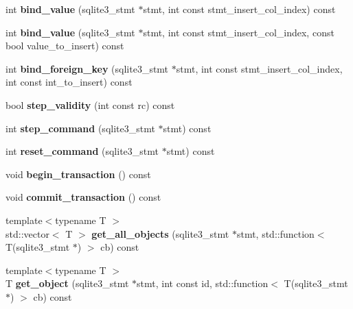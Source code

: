 \begin{DoxyCompactItemize}
int {\bfseries bind\+\_\+value} (sqlite3\+\_\+stmt $\ast$stmt, int const stmt\+\_\+insert\+\_\+col\+\_\+index) const
\item 
\mbox{\label{class_s_q_lite_wrapper_a4b6f58f924fae97702115f34ea8abf22}} 
int {\bfseries bind\+\_\+value} (sqlite3\+\_\+stmt $\ast$stmt, int const stmt\+\_\+insert\+\_\+col\+\_\+index, const bool value\+\_\+to\+\_\+insert) const
\item 
\mbox{\label{class_s_q_lite_wrapper_a21b4c5733febabb2a4f21772b7cfdec1}} 
int {\bfseries bind\+\_\+foreign\+\_\+key} (sqlite3\+\_\+stmt $\ast$stmt, int const stmt\+\_\+insert\+\_\+col\+\_\+index, int const int\+\_\+to\+\_\+insert) const
\item 
\mbox{\label{class_s_q_lite_wrapper_a2c0169834d2518ede1f00b92ffbed3e2}} 
bool {\bfseries step\+\_\+validity} (int const rc) const
\item 
\mbox{\label{class_s_q_lite_wrapper_aed2fd5a33db820461662e6ffdc05808b}} 
int {\bfseries step\+\_\+command} (sqlite3\+\_\+stmt $\ast$stmt) const
\item 
\mbox{\label{class_s_q_lite_wrapper_aeef995f134463b92babcd805444a1783}} 
int {\bfseries reset\+\_\+command} (sqlite3\+\_\+stmt $\ast$stmt) const
\item 
\mbox{\label{class_s_q_lite_wrapper_a7390f800549dbb01bb6bea58f3834c0c}} 
void {\bfseries begin\+\_\+transaction} () const
\item 
\mbox{\label{class_s_q_lite_wrapper_a80905f75cc7115658a61037a4c7a2e62}} 
void {\bfseries commit\+\_\+transaction} () const
\item 
\mbox{\label{class_s_q_lite_wrapper_ad729120a855cf8db16940f9798897cc5}} 
{\footnotesize template$<$typename T $>$ }\\std\+::vector$<$ T $>$ {\bfseries get\+\_\+all\+\_\+objects} (sqlite3\+\_\+stmt $\ast$stmt, std\+::function$<$ T(sqlite3\+\_\+stmt $\ast$) $>$ cb) const
\item 
\mbox{\label{class_s_q_lite_wrapper_a7b08d5d170b1c19f7a0be0ecdec4195e}} 
{\footnotesize template$<$typename T $>$ }\\T {\bfseries get\+\_\+object} (sqlite3\+\_\+stmt $\ast$stmt, int const id, std\+::function$<$ T(sqlite3\+\_\+stmt $\ast$) $>$ cb) const
\end{DoxyCompactItemize}
